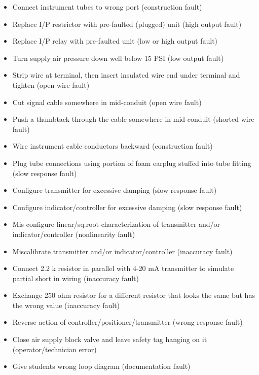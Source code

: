 \documentclass[12pt,a4paper]{article}
\begin{document}
\begin{itemize}
\item{} Connect instrument tubes to wrong port (construction fault)
\item{} Replace I/P restrictor with pre-faulted (plugged) unit (high output fault)
\item{} Replace I/P relay with pre-faulted unit (low or high output fault)
\item{} Turn supply air pressure down well below 15 PSI (low output fault)
\item{} Strip wire at terminal, then insert insulated wire end under terminal and tighten (open wire fault)
\item{} Cut signal cable somewhere in mid-conduit (open wire fault)
\item{} Push a thumbtack through the cable somewhere in mid-conduit (shorted wire fault)
\item{} Wire instrument cable conductors backward (construction fault)
\item{} Plug tube connections using portion of foam earplug stuffed into tube fitting (slow response fault)
\item{} Configure transmitter for excessive damping (slow response fault)
\item{} Configure indicator/controller for excessive damping (slow response fault)
\item{} Mis-configure linear/sq.root characterization of transmitter and/or indicator/controller (nonlinearity fault)
\item{} Miscalibrate transmitter and/or indicator/controller (inaccuracy fault)
\item{} Connect 2.2 k resistor in parallel with 4-20 mA transmitter to simulate partial short in wiring (inaccuracy fault)
\item{} Exchange 250 ohm resistor for a different resistor that looks the same but has the wrong value (inaccuracy fault) 
\item{} Reverse action of controller/positioner/transmitter (wrong response fault)
\item{} Close air supply block valve and leave safety tag hanging on it (operator/technician error)
\item{} Give students wrong loop diagram (documentation fault)
\end{itemize}
\end{document}
